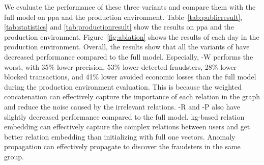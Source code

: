 We evaluate the performance of these three variants and compare them with the full model on \ac{ppa} and the production environment.
Table~\ref{tab:publicresult}, \ref{tab:statistics} and \ref{tab:productionresult} show the results on \ac{ppa} and the production environment. Figure~\ref{fig:ablation} shows the results of each day in the production environment.
Overall, the results show that all the variants of \toolname have decreased performance compared to the full model. Especially, \toolname-W performs the worst, with 35\% lower precision, 53\% lower detected fraudsters, 28\% lower blocked transactions, and 41\% lower avoided economic losses than the full model during the production environment evaluation. This is because the weighted concatenation can effectively capture the importance of each relation in the graph and reduce the noise caused by the irrelevant relations. \toolname-R and \toolname-P also have slightly decreased performance compared to the full model. \ac{kg}-based relation embedding can effectively capture the complex relations between users and get better relation embedding than initializing with full one vectors. Anomaly propagation can effectively propagate to discover the fraudsters in the same group. 



